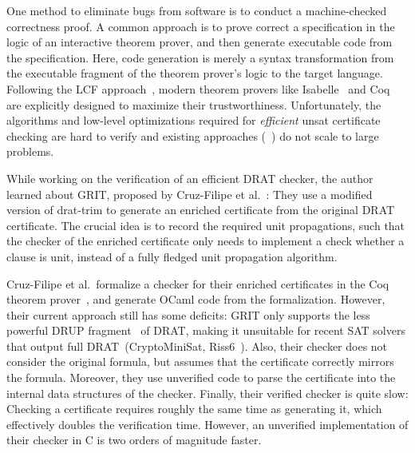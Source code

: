 \documentclass[smallcondensed]{svjour3}     %
\begin{document}
One method to eliminate bugs from software is to conduct a machine-checked correctness proof. 
A common approach is to prove correct a specification in the logic of an interactive theorem prover, and then generate executable code from 
the specification. Here, code generation is merely a syntax transformation from the executable fragment of the theorem prover's logic to the target language.
Following the LCF approach~\cite{Gord00}, modern theorem provers like Isabelle~\cite{NPW02} and Coq~\cite{BeCa10} are explicitly designed to maximize their trustworthiness.
Unfortunately, the algorithms and low-level optimizations required for \emph{efficient} unsat certificate checking are 
hard to verify and existing approaches (\eg~\cite{DFM10,WHH13}) do not scale to large problems.

While working on the verification of an efficient DRAT checker, the author learned about GRIT, proposed by Cruz-Filipe et al.~\cite{CMS17}: 
They use a modified version of drat-trim to generate an enriched certificate from the original DRAT certificate. 
The crucial idea is to record the required unit propagations, such that the checker of the enriched certificate only needs 
to implement a check whether a clause is unit, instead of a fully fledged unit propagation algorithm.

Cruz-Filipe et al.\ formalize a checker for their enriched certificates in the Coq theorem prover~\cite{BeCa10}, and generate OCaml code from the formalization. 
However, their current approach still has some deficits:
GRIT only supports the less powerful DRUP fragment~\cite{WHH13} of DRAT, making it unsuitable for recent SAT solvers that output full DRAT~(\eg CryptoMiniSat, Riss6~\cite{SATCOMP16}).
Also, their checker does not consider the original formula, but assumes that the certificate correctly mirrors the formula. 
Moreover, they use unverified code to parse the certificate into the internal data structures of the checker.
Finally, their verified checker is quite slow: Checking a certificate requires roughly the same time as generating it, which effectively doubles the verification time.
However, an unverified implementation of their checker in C is two orders of magnitude faster.

% 
% 
\end{document}
